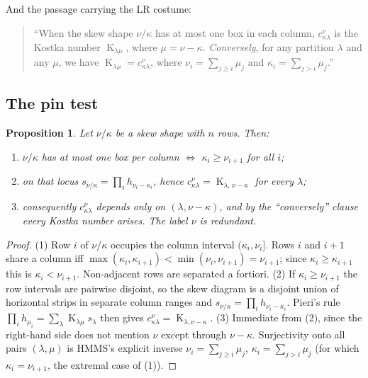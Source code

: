 \documentclass[11pt]{article}
\newtheorem{proposition}[theorem]{Proposition}
\theoremstyle{definition}
\DeclareMathOperator{\Kostka}{K}
\begin{document}
And the passage carrying the LR costume:

\begin{quote}
``When the skew shape $\nu/\kappa$ has at most one box in each column, $c^\nu_{\kappa\lambda}$
is the Kostka number $\Kostka_{\lambda\mu}$, where $\mu=\nu-\kappa$. \emph{Conversely}, for
any partition $\lambda$ and any $\mu$, we have $\Kostka_{\lambda\mu}=c^{\nu}_{\kappa\lambda}$,
where $\nu_i=\sum_{j\ge i}\mu_j$ and $\kappa_i=\sum_{j>i}\mu_j$.''
\end{quote}

\subsection{The pin test}

\begin{proposition}\label{prop:pin}
Let $\nu/\kappa$ be a skew shape with $n$ rows. Then:
\begin{enumerate}
\item $\nu/\kappa$ has at most one box per column $\iff$ $\kappa_i\ge\nu_{i+1}$ for all $i$;
\item on that locus $s_{\nu/\kappa}=\prod_i h_{\nu_i-\kappa_i}$, hence
      $c^\nu_{\kappa\lambda}=\Kostka_{\lambda,\,\nu-\kappa}$ for every $\lambda$;
\item consequently $c^\nu_{\kappa\lambda}$ depends only on $(\lambda,\nu-\kappa)$, and by the
      ``conversely'' clause every Kostka number arises. The label $\nu$ is redundant.
\end{enumerate}
\end{proposition}

\begin{proof}
(1) Row $i$ of $\nu/\kappa$ occupies the column interval $(\kappa_i,\nu_i]$. Rows $i$ and
$i+1$ share a column iff $\max(\kappa_i,\kappa_{i+1})<\min(\nu_i,\nu_{i+1})=\nu_{i+1}$;
since $\kappa_i\ge\kappa_{i+1}$ this is $\kappa_i<\nu_{i+1}$. Non-adjacent rows are
separated a fortiori.
(2) If $\kappa_i\ge\nu_{i+1}$ the row intervals are pairwise disjoint, so the skew diagram
is a disjoint union of horizontal strips in separate column ranges and
$s_{\nu/\kappa}=\prod_i h_{\nu_i-\kappa_i}$. Pieri's rule
$\prod_i h_{\mu_i}=\sum_\lambda \Kostka_{\lambda\mu}s_\lambda$ then gives
$c^\nu_{\kappa\lambda}=\Kostka_{\lambda,\nu-\kappa}$.
(3) Immediate from (2), since the right-hand side does not mention $\nu$ except through
$\nu-\kappa$. Surjectivity onto all pairs $(\lambda,\mu)$ is HMMS's explicit inverse
$\nu_i=\sum_{j\ge i}\mu_j$, $\kappa_i=\sum_{j>i}\mu_j$ (for which $\kappa_i=\nu_{i+1}$, the
extremal case of (1)).
\end{proof}
\end{document}
